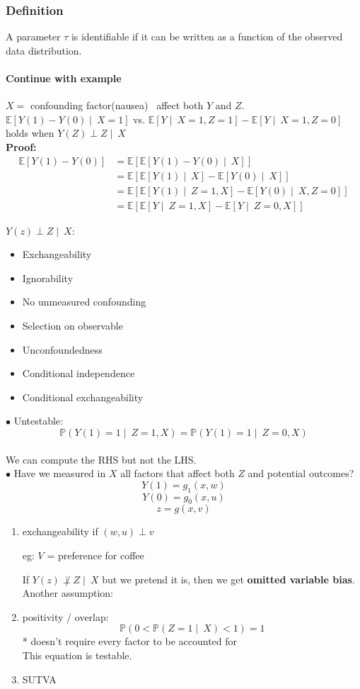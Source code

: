 \subsubsection{Definition}
A parameter $\tau$ is identifiable if it can be written as a function of the observed data distribution.

\paragraph{Continue with example}
$X = $ confounding factor(nausea) \textrightarrow\  affect both $Y$ and $Z$.\\
$\mathbb{E}[Y(1) - Y(0) \mid\ X = 1]$ vs. $\mathbb{E}[Y \mid\ X = 1, Z = 1] - \mathbb{E}[Y \mid\ X = 1, Z = 0]$ holds when $Y(Z) \perp Z \mid\ X$ \\
\textbf{Proof:}
\begin{align}
    \mathbb{E}[Y(1) - Y(0)] &= \mathbb{E}[\mathbb{E}[Y(1) - Y(0) \mid\ X]]\\
    &= \mathbb{E}[\mathbb{E}[Y(1) \mid\ X] - \mathbb{E}[ Y(0) \mid\ X]]\\
    &= \mathbb{E}[\mathbb{E}[Y(1) \mid\ Z = 1, X] - \mathbb{E}[Y(0) \mid\ X, Z = 0]]\\
    &= \mathbb{E}[\mathbb{E}[Y \mid\ Z = 1, X] - \mathbb{E}[Y \mid\ Z = 0, X]]
\end{align}

$Y(z) \perp Z \mid\ X$:
\begin{itemize}
    \item Exchangeability
    \item Ignorability
    \item No unmeasured confounding
    \item Selection on observable
    \item Unconfoundedness
    \item Conditional independence
    \item Conditional exchangeability
\end{itemize}

$\bullet$ Untestable:
$$\mathbb{P} (Y(1) = 1 \mid\ Z = 1, X) = \mathbb{P} (Y(1) = 1 \mid\ Z = 0, X)$$\\
We can compute the RHS but not the LHS. \\
$\bullet$ Have we measured in $X$ all factors that affect both $Z$ and potential outcomes?
$$Y(1) = g_1 (x, w)$$
$$Y(0) = g_0 (x, u)$$
$$ z = g (x, v)$$
\begin{enumerate}
    \item exchangeability if $(w, u) \perp v$

eg: $V$ = preference for coffee 

If $Y(z) \not\perp Z \mid\ X$ but we pretend it is, then we get \textbf{omitted variable bias}.\\
Another assumption: 
    \item positivity / overlap: 
$$\mathbb{P}(0 < \mathbb{P} (Z = 1 \mid\ X) < 1) = 1$$ * doesn't require every factor to be accounted for\\
This equation is testable.
    \item SUTVA
\end{enumerate} 
